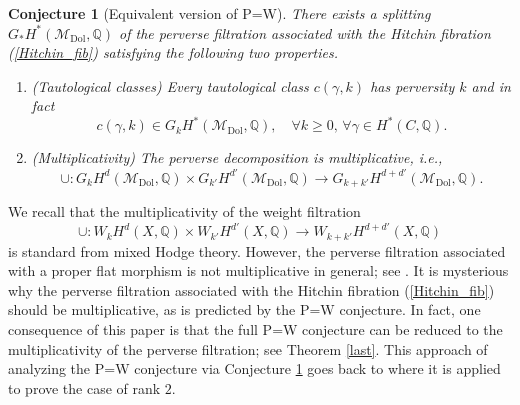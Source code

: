 \documentclass[11pt]{amsart}
\theoremstyle{plain}
\newtheorem{conj}[thm]{Conjecture}
\theoremstyle{definition}
\theoremstyle{remark}
\newcommand{\BQ}{{\mathbb{Q}}}
\newcommand{\CM}{{\mathcal M}}
\begin{document}
\begin{conj}[Equivalent version of P=W]\label{P=W2} 
There exists a splitting $G_*H^*(\CM_{\mathrm{Dol}}, \BQ)$ of the perverse filtration associated with the Hitchin fibration (\ref{Hitchin_fib}) satisfying the following two properties.
\begin{enumerate}
    \item[(a)](Tautological classes) 
   Every tautological class $c(\gamma,k)$ has perversity $k$ and in fact
    \begin{equation*}\label{taut_conj}
    c(\gamma,k) \in G_kH^{\ast}(\CM_{\mathrm{Dol}}, \BQ),\quad \forall k \geq 0, \, \forall \gamma \in H^*(C, \BQ).
    \end{equation*}
  
    \item[(b)] (Multiplicativity) The perverse decomposition is multiplicative, \emph{i.e.}, 
    \[
    \cup: G_k H^d(\CM_\mathrm{Dol}, \BQ)\times G_{k'} H^{d'}(\CM_\mathrm{Dol}, \BQ) \to G_{k+k'} H^{d+d'}(\CM_\mathrm{Dol}, \BQ).
    \]
\end{enumerate}
\end{conj}

We recall that the multiplicativity of the weight filtration
\[
\cup: W_k H^d(X, \BQ) \times W_{k'} H^{d'}(X, \BQ) \to W_{k+k'}H^{d+d'}(X, \BQ)
\]
is standard from mixed Hodge theory. However, the perverse filtration associated with a proper flat morphism is not multiplicative in general; see \cite[Exercise 5.6.8]{Park}. It is mysterious why the perverse filtration associated with the Hitchin fibration (\ref{Hitchin_fib}) should be multiplicative, as is predicted by the P=W conjecture. In fact, one consequence of this paper is that the full P=W conjecture can be reduced to the multiplicativity of the perverse filtration; see Theorem \ref{last}.  This approach of analyzing the P=W conjecture via Conjecture \ref{P=W2} goes back to \cite{dCHM1} where it is applied to prove the case of rank $2$.
\end{document}
